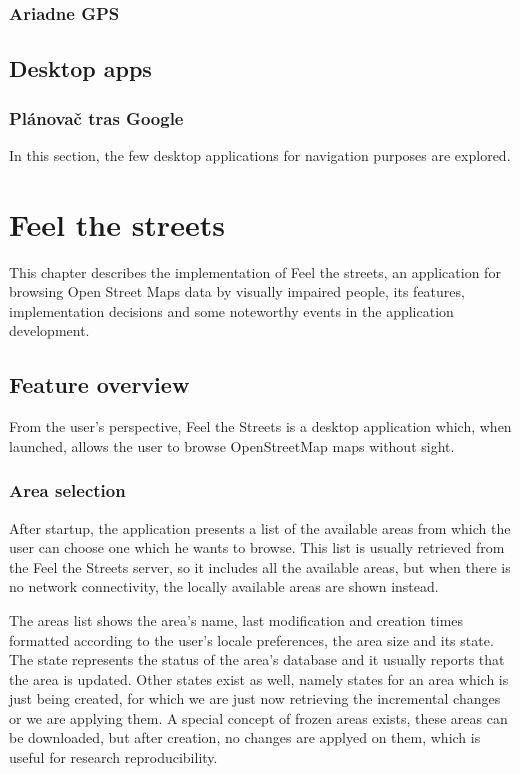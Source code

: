 \documentclass[nolof,digital]{fithesis3}
\begin{document}
\subsection{Ariadne GPS}

\section{Desktop apps}
\subsection{Plánovač tras Google}
In this section, the few desktop applications for navigation purposes are explored.
\chapter{Feel the streets}
This chapter describes the implementation of Feel the streets, an application for browsing Open Street Maps data by visually impaired people, its features, implementation decisions and some noteworthy events in the application development.
\section{Feature overview}
From the user's perspective, Feel the Streets is a desktop application which, when launched, allows the user to browse OpenStreetMap maps without sight.
\subsection{Area selection}
After startup, the application presents a list of the available areas from which the user can choose one which he wants to browse. This list is usually retrieved from the Feel the Streets server, so it includes all the available areas, but when there is no network connectivity, the locally available areas are shown instead.

The areas list shows the area's name, last modification and creation times formatted according to the user's locale preferences, the area size and its state. The state represents the status of the area's database and it usually reports that the area is updated. Other states exist as well, namely states for an area which is just being created, for which we are just now retrieving the incremental changes or we are applying them. A special concept of frozen areas exists, these areas can be downloaded, but after creation, no changes are applyed on them, which is useful for research reproducibility.
\end{document}
